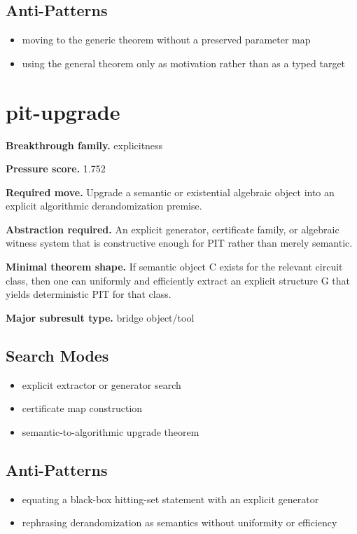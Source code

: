 \documentclass[11pt]{article}
\begin{document}
\subsection*{Anti-Patterns}
\begin{itemize}[leftmargin=*,itemsep=0.2em]
\item moving to the generic theorem without a preserved parameter map
\item using the general theorem only as motivation rather than as a typed target
\end{itemize}
\section{pit-upgrade}
\textbf{Breakthrough family.} explicitness

\textbf{Pressure score.} 1.752

\textbf{Required move.} Upgrade a semantic or existential algebraic object into an explicit algorithmic derandomization premise.

\textbf{Abstraction required.} An explicit generator, certificate family, or algebraic witness system that is constructive enough for PIT rather than merely semantic.

\textbf{Minimal theorem shape.} If semantic object C exists for the relevant circuit class, then one can uniformly and efficiently extract an explicit structure G that yields deterministic PIT for that class.

\textbf{Major subresult type.} bridge object/tool

\subsection*{Search Modes}
\begin{itemize}[leftmargin=*,itemsep=0.2em]
\item explicit extractor or generator search
\item certificate map construction
\item semantic-to-algorithmic upgrade theorem
\end{itemize}
\subsection*{Anti-Patterns}
\begin{itemize}[leftmargin=*,itemsep=0.2em]
\item equating a black-box hitting-set statement with an explicit generator
\item rephrasing derandomization as semantics without uniformity or efficiency
\end{itemize}
\end{document}
